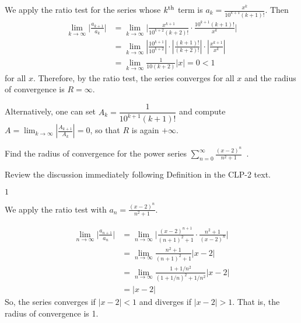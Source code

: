 \begin{solution}
We apply the ratio test for the series whose $k^{\rm th}$
term is $a_k= \frac{x^k}{ 10^{k+1}(k+1)! }$. Then
\begin{align*}
\lim_{k\to\infty} \bigg| \frac{ a_{k+1} }{ a_k } \bigg|
&= \lim_{k\to\infty} \bigg| \frac{x^{k+1}}{10^{k+2}(k+2)!} \cdot
                             \frac{10^{k+1}(k+1)!}{x^k} \bigg| \\
&=\lim_{k\to\infty} \left|\frac{10^{k+1}}{10^{k+2}}\right|\cdot\left|\frac{(k+1)!}{(k+2)!}\right|\cdot\left|\frac{x^{k+1}}{x^k}\right|\\
&= \lim_{k\to\infty}\frac{1}{10(k+2)}|x| = 0 < 1
\end{align*}
for all $x$.
Therefore, by the ratio test, the series converges for all $x$
and the radius of convergence is $R = \infty$.

Alternatively, one can set $A_k = \dfrac{1}{10^{k+1}(k+1)!}$ and compute
$A = \displaystyle\lim_{k\to\infty} \left| \frac{A_{k+1}}{A_k}\right| = 0$, so that
$R$ is again $+\infty$.


\end{solution}


\begin{question}[2014A]
Find the radius of convergence for the power series
$\displaystyle\sum_{n=0}^\infty \frac{(x - 2)^n}{n^2+1}$\ .
\end{question}

\begin{hint}
Review the discussion immediately following Definition
 in the
CLP-2 text.
\end{hint}

\begin{answer}
$1$
\end{answer}

\begin{solution}
We apply the ratio test with $a_n = \frac{(x - 2)^n}{n^2+1}$.

\begin{align*}
\lim_{n\rightarrow\infty}\Big|\frac{a_{n+1}}{a_n}\Big|
&=\lim_{n\rightarrow\infty}\bigg|\frac{(x-2)^{n+1}}{(n+1)^2+1}\cdot
                               \frac{n^2+1}{(x-2)^n}\bigg|\\
&=\lim_{n\rightarrow\infty}\frac{n^2+1}{(n+1)^2+1}
                               |x-2|\\
&=\lim_{n\rightarrow\infty}\frac{1+1/n^2}{(1+1/n)^2+1/n^2}
                               |x-2|\\
&=|x-2|
\end{align*}
So, the series converges if $|x-2|<1$ and diverges if $|x-2|>1$.
That is, the radius of convergence is 1.
\end{solution}


